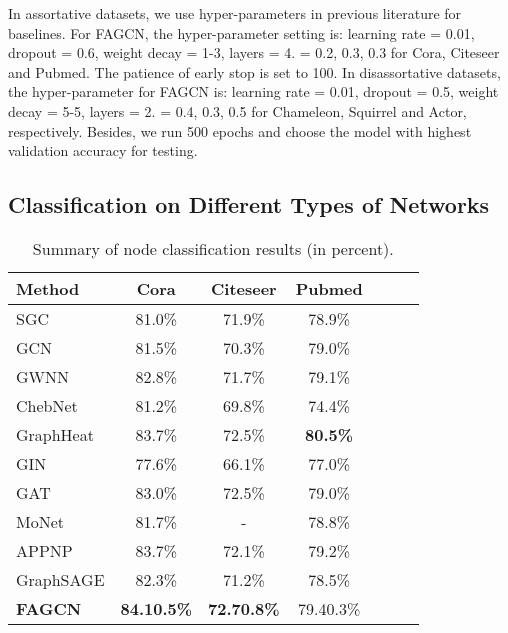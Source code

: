 \documentclass[letterpaper]{article} \usepackage{aaai21}  \usepackage{times}  \usepackage{helvet} \usepackage{courier}  \usepackage[hyphens]{url}  \usepackage{graphicx} \urlstyle{rm} \def\UrlFont{\rm}  \usepackage{natbib}  \usepackage{caption} \frenchspacing  \setlength{\pdfpagewidth}{8.5in}  \setlength{\pdfpageheight}{11in}
\begin{document}
In assortative datasets, we use hyper-parameters in previous literature for baselines. For FAGCN, the hyper-parameter setting is: learning rate = 0.01, dropout = 0.6, weight decay = 1-3, layers = 4.  = 0.2, 0.3, 0.3 for Cora, Citeseer and Pubmed. The patience of early stop is set to 100.
In disassortative datasets, the hyper-parameter for FAGCN is: learning rate = 0.01, dropout = 0.5, weight decay = 5-5, layers = 2.  = 0.4, 0.3, 0.5 for Chameleon, Squirrel and Actor, respectively.
Besides, we run 500 epochs and choose the model with highest validation accuracy for testing.

\subsection{Classification on Different Types of Networks}
\label{sec:results}

\newsavebox{\tablebox}
\begin{table}
  \centering
  \caption{Summary of node classification results (in percent).}
	\begin{lrbox}{\tablebox}
    \begin{tabular}{lcccccc}
    \toprule
    \textbf{Method} & \textbf{Cora} & \textbf{Citeseer} & \textbf{Pubmed} \\
    \midrule
	SGC & 81.0\% & 71.9\% & 78.9\% \\
    GCN & 81.5\% & 70.3\% & 79.0\% \\
    GWNN & 82.8\% & 71.7\% & 79.1\%\\
    ChebNet & 81.2\% & 69.8\% & 74.4\%\\
    GraphHeat & 83.7\% & 72.5\% & \textbf{80.5\%}\\
	\midrule
	GIN & 77.6\% & 66.1\% & 77.0\%\\ 
	GAT & 83.0\% & 72.5\% & 79.0\%\\
	MoNet & 81.7\% & -     & 78.8\%\\
	APPNP & 83.7\% & 72.1\% & 79.2\%\\
    GraphSAGE & 82.3\% & 71.2\% & 78.5\%\\
    \midrule
\textbf{FAGCN} & \textbf{84.10.5\%} & \textbf{72.70.8\%} & 79.40.3\% \\
    \bottomrule
    \end{tabular}
    \end{lrbox}
    \scalebox{1}{\usebox{\tablebox}}
  \label{assortative}
\end{table}
\end{document}
